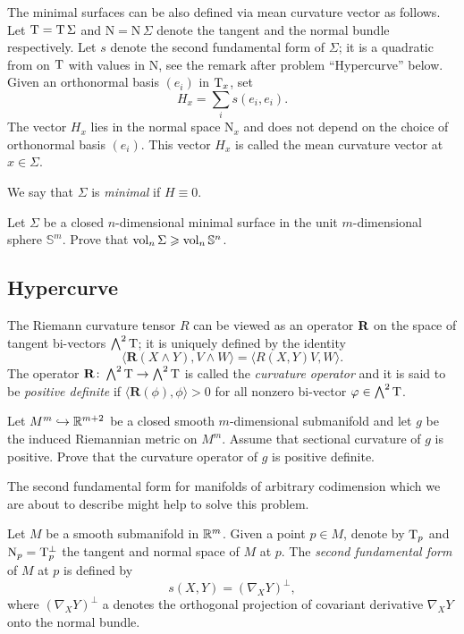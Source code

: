 The minimal surfaces can be also defined via mean curvature vector as follows.
Let $\mathrm{T}=\mathrm{T}\,\Sigma$ and $\mathrm{N}=\mathrm{N}\,\Sigma$ denote the tangent and the normal bundle respectively.
Let $s$ denote the second fundamental form of $\Sigma$;
it is a quadratic from on $\mathrm{T}$ with values in $\mathrm{N}$,
see the remark after problem ``Hypercurve'' below. 
Given an orthonormal basis $(e_i)$ in $\mathrm{T}_x$, set 
$$H_x=\sum_i s(e_i,e_i).$$
The vector $H_x$ lies in the normal space $\mathrm{N}_x$
and does not depend on the choice of orthonormal basis $(e_i)$.
This vector $H_x$ is called the mean curvature vector at $x\in \Sigma$. 

We say that $\Sigma$ is \emph{minimal} if $H\equiv 0$.

\begin{pr}
Let $\Sigma$ be a closed $n$-dimensional 
minimal surface
in the unit $m$-dimensional sphere $\mathbb{S}^m$.
Prove that
$\operatorname{\rm vol}\nolimits_n \Sigma\geqslant \operatorname{\rm vol}\nolimits_n \mathbb{S}^n$.
\end{pr}

\subsection*{Hypercurve}
\label{codim=2}

The Riemann curvature tensor $R$
can be viewed as an operator $\text{\bf R}$ on the space of tangent bi-vectors $\bigwedge^2 \mathrm{T}$;
it is uniquely defined by the identity
$$\langle\mathbf{R}(X\wedge Y),V\wedge W\rangle
=
\langle R(X,Y)V,W\rangle.$$
The operator $\mathbf{R}\colon\bigwedge^2 \mathrm{T}\to \bigwedge^2 \mathrm{T}$ is called the \emph{curvature operator} and it is said to be {}\emph{positive definite} if
$\langle\mathbf{R}(\phi),\phi\rangle>0$ for all nonzero
bi-vector $\varphi\in\bigwedge^2 \mathrm{T}$.


\begin{pr}
Let $M^m\hookrightarrow \mathbb{R}^{m+2}$ be a closed smooth $m$-dimensional
submanifold and let  $g$ be the  induced Riemannian metric on $M^m$.
Assume that sectional curvature of $g$ is positive.
Prove that the curvature operator of $g$ is positive definite.
\end{pr}

The second fundamental form for manifolds of arbitrary codimension which we are about to describe might help to solve this problem.

Let $M$ be a smooth submanifold in $\mathbb{R}^m$.
Given a point $p\in M$, denote by $\mathrm{T}_p$ and $\mathrm{N}_p=\mathrm{T}_p^\bot$
the tangent and normal space of $M$ at $p$.
The \emph{second fundamental form}\label{page:second fundamental form} of $M$ at $p$ is defined by 
\[s(X,Y)=(\nabla_X Y)^\bot,\]
where $(\nabla_X Y)^\bot$ a denotes the orthogonal projection of covariant derivative $\nabla_X Y$ onto the normal bundle.

